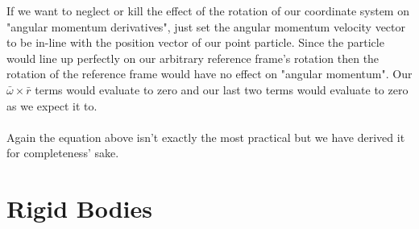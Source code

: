 If we want to neglect or kill the effect of the rotation of our coordinate system on "angular momentum derivatives", just set the angular momentum velocity vector to be in-line with the position vector of our point particle.
Since the particle would line up perfectly on our arbitrary reference frame's rotation then the rotation of the reference frame would have no effect on "angular momentum".
Our $\bar{\omega}\times\bar{r}$ terms would evaluate to zero and our last two terms would evaluate to zero as we expect it to.
\\~\\Again the equation above isn't exactly the most practical but we have derived it for completeness' sake.

\section{Rigid Bodies}
\begin{comment}
Kind of incomplete, more information about the colinear argument need to be made
\end{comment}
